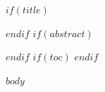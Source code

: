 \documentclass[
  $if(fontsize)$$fontsize$,$endif$
  a4paper
]{article}
\author{$for(author)$$author$$sep$ \and $endfor$}
\begin{document}
$if(title)$\maketitle$endif$
$if(abstract)$
\begin{abstract}
\noindent $abstract$
\end{abstract}
\vspace{1em}
$endif$
$if(toc)$
\tableofcontents
\newpage
$endif$

$body$
\end{document}
